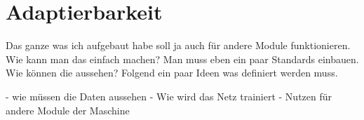 \chapter{Adaptierbarkeit}
Das ganze was ich aufgebaut habe soll ja auch für andere Module funktionieren. Wie kann man das einfach machen? Man muss
eben ein paar Standards einbauen. Wie können die aussehen? Folgend ein paar Ideen was definiert werden muss.

- wie müssen die Daten aussehen
- Wie wird das Netz trainiert
- Nutzen für andere Module der Maschine